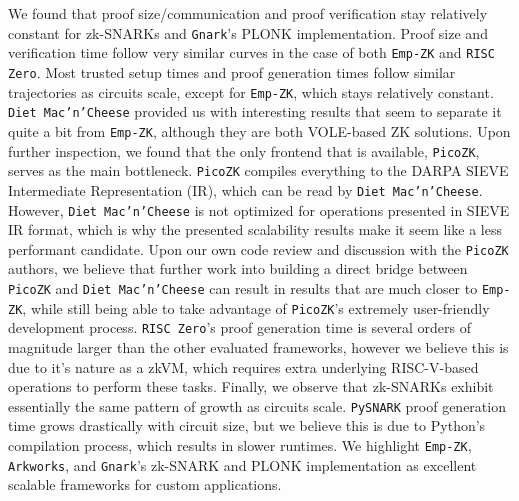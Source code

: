 We found that proof size/communication and proof verification stay relatively constant for zk-SNARKs and \texttt{Gnark}'s PLONK implementation. Proof size and verification time follow very similar curves in the case of both \texttt{Emp-ZK} and \texttt{RISC Zero}. Most trusted setup times and proof generation times follow similar trajectories as circuits scale, except for \texttt{Emp-ZK}, which stays relatively constant. \texttt{Diet Mac'n'Cheese} provided us with interesting results that seem to separate it quite a bit from \texttt{Emp-ZK}, although they are both VOLE-based ZK solutions. Upon further inspection, we found that the only frontend that is available, \texttt{PicoZK}, serves as the main bottleneck. \texttt{PicoZK} compiles everything to the DARPA SIEVE Intermediate Representation (IR), which can be read by \texttt{Diet Mac'n'Cheese}. However, \texttt{Diet Mac'n'Cheese} is not optimized for operations presented in SIEVE IR format, which is why the presented scalability results make it seem like a less performant candidate. Upon our own code review and discussion with the \texttt{PicoZK} authors, we believe that further work into building a direct bridge between \texttt{PicoZK} and \texttt{Diet Mac'n'Cheese} can result in results that are much closer to \texttt{Emp-ZK}, while still being able to take advantage of \texttt{PicoZK}'s extremely user-friendly development process. \texttt{RISC Zero}'s proof generation time is several orders of magnitude larger than the other evaluated frameworks, however we believe this is due to it's nature as a zkVM, which requires extra underlying RISC-V-based operations to perform these tasks. Finally, we observe that zk-SNARKs exhibit essentially the same pattern of growth as circuits scale. \texttt{PySNARK} proof generation time grows drastically with circuit size, but we believe this is due to Python's compilation process, which results in slower runtimes. We highlight \texttt{Emp-ZK}, \texttt{Arkworks}, and \texttt{Gnark}'s zk-SNARK and PLONK implementation as excellent scalable frameworks for custom applications.

